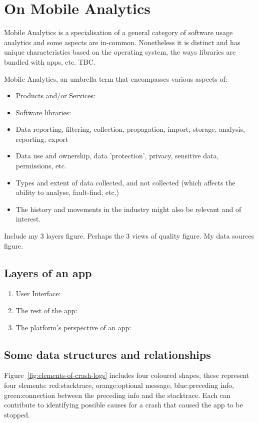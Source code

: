 \chapter{On Mobile Analytics}
\label{app:on-mobile-analytics}

Mobile Analytics is a specialisation of a general category of software usage analytics and some aspects are in-common. Nonetheless it is distinct and has unique characteristics based on the operating system, the ways libraries are bundled with apps, etc. TBC.

Mobile Analytics, an umbrella term that encompasses various aspects of:
\begin{itemize}
    \item Products and/or Services:
    \item Software libraries:
    \item Data reporting, filtering, collection, propagation, import, storage, analysis, reporting, export
    \item Data use and ownership, data 'protection', privacy, sensitive data, permissions, etc.
    \item Types and extent of data collected, and not collected (which affects the ability to analyse, fault-find, etc.)
    \item The history and movements in the industry might also be relevant and of interest.
\end{itemize}

Include my 3 layers figure. Perhaps the 3 views of quality figure. My data sources figure. 

\section{Layers of an app}
\begin{enumerate}
    \item User Interface:
    \item The rest of the app:
    \item The platform's perspective of an app:
\end{enumerate}


\section{Some data structures and relationships}
Figure~\ref{fig:elements-of-crash-logs} includes four coloured shapes, these represent four elements: red:stacktrace, orange:optional message, blue:preceding info, green:connection between the preceding info and the stacktrace. Each can contribute to identifying possible causes for a crash that caused the app to be stopped.


